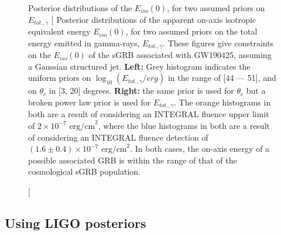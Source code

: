     \begin{figure}[H]
        \begin{subfigure}{0.5\textwidth}
              \label{fig:unif}
              \centering
              \def\svgwidth{\textwidth}
              
        \end{subfigure}%
        \begin{subfigure}{0.5\textwidth}
              \label{fig:bpl}
              \centering
              \def\svgwidth{\textwidth}
              
        \end{subfigure}
        \caption
        [
            Posterior distributions of the $E_{iso}(0)$, for two assumed priors
            on $E_{tot., \gamma}$
        ]
        {
            Posterior distributions of the apparent on-axis isotropic equivalent energy
            $E_{iso}(0)$, for two assumed priors on the total energy emitted in
            gamma-rays, $E_{tot., \gamma}$. These figures give constraints on the
            $E_{iso}(0)$ of the sGRB associated with GW190425, assuming a Gaussian
            structured jet. \textbf{Left:} Grey histogram indicates the uniform priors
            on $\log_{10}(E_{tot., \gamma}/erg)$ in the range of [44 --- 51], and on
            $\theta_c$ in [3, 20] degrees.  \textbf{Right:} the same prior is used for
            $\theta_c$ but a broken power law prior is used for $E_{tot., \gamma}$. The
            orange histograms in both are a result of considering an INTEGRAL fluence
            upper limit of $2 \times 10^{-7} \text{ erg/cm}^2$, where the blue
            histograms in both are a result of considering an INTEGRAL fluence detection
            of $(1.6 \pm 0.4) \times 10^{-7} \text{ erg/cm}^2$. In both cases, the
            on-axis energy of a possible associated GRB is within the range of that of
            the cosmological sGRB population.
        }
        \label{fig:unif_bpl}
    \end{figure}


    \subsection{Using LIGO posteriors}

